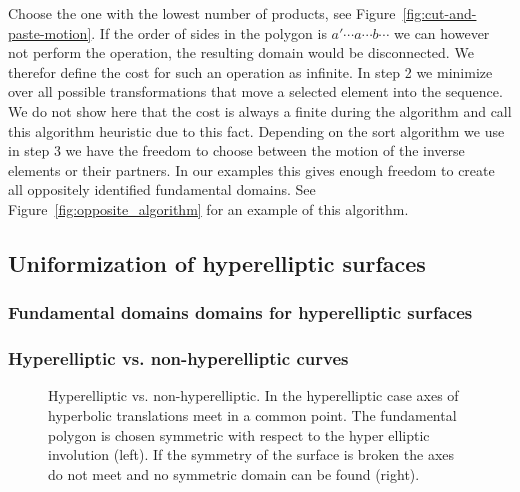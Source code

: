\documentclass[Thesis]{subfiles}
\begin{document}
Choose the one with the lowest number of products, see Figure~\ref{fig:cut-and-paste-motion}. If the order of sides in the polygon is $a' \cdots a \cdots b \cdots$ we can however not perform the operation, the resulting domain would be disconnected. We therefor define the cost for such an operation as infinite. In step 2 we minimize over all possible transformations that move a selected element into the sequence. We do not show here that the cost is always a finite during the algorithm and call this algorithm heuristic due to this fact. Depending on the sort algorithm we use in step 3 we have the freedom to choose between the motion of the inverse elements or their partners. In our examples this gives enough freedom to create all oppositely identified fundamental domains. See Figure~\ref{fig:opposite_algorithm} for an example of this algorithm.



\subsection{Uniformization of hyperelliptic surfaces}
\label{sec:hyperelliptic}



\subsubsection{Fundamental domains domains for hyperelliptic surfaces}
\label{sec:hyperelliptic_domain}


\subsubsection{Hyperelliptic vs. non-hyperelliptic curves}
\label{sec:non-hyperelliptic}

\begin{figure}
\centering
{}
\caption{Hyperelliptic vs. non-hyperelliptic. In the hyperelliptic case axes of hyperbolic translations meet in a common point. The fundamental polygon is chosen symmetric with respect to the hyper elliptic involution (left). If the symmetry of the surface is broken the axes do not meet and no symmetric domain can be found (right).}
\label{fig:non-hyperelliptic}
\end{figure}
\end{document}
